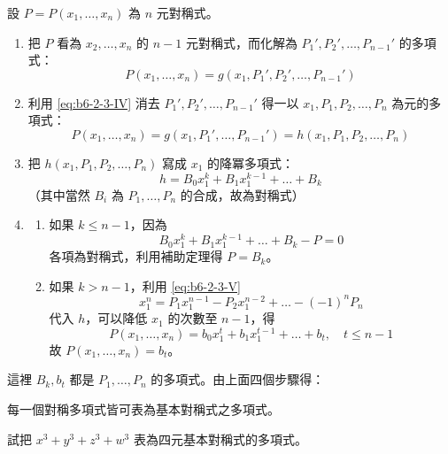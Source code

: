 設 $P=P(x_1, \dots, x_n)$ 為 $n$ 元對稱式。
\begin{enumerate}[label=(\Roman*), leftmargin=2em]
  \item 把 $P$ 看為 $x_2, \dots, x_n$ 的 $n-1$ 元對稱式，而化解為 $P_1', P_2', \dots, P_{n-1}'$ 的多項式：
  \[ P(x_1, \dots, x_n) = g(x_1, P_1', P_2', \dots, P_{n-1}') \]
  \item 利用 \eqref{eq:b6-2-3-IV} 消去 $P_1', P_2', \dots, P_{n-1}'$ 得一以 $x_1, P_1, P_2, \dots, P_n$ 為元的多項式：
  \[ P(x_1, \dots, x_n) = g(x_1, P_1', \dots, P_{n-1}') = h(x_1, P_1, P_2, \dots, P_n) \]
  \item 把 $h(x_1, P_1, P_2, \dots, P_n)$ 寫成 $x_1$ 的降冪多項式：
  \[ h = B_0 x_1^k + B_1 x_1^{k-1} + \dots + B_k \]
  （其中當然 $B_i$ 為 $P_1, \dots, P_n$ 的合成，故為對稱式）
  \item 
  \begin{enumerate}[label=(\alph*)]
    \item 如果 $k \le n-1$，因為
    \[ B_0 x_1^k + B_1 x_1^{k-1} + \dots + B_k - P = 0 \]
    各項為對稱式，利用補助定理得 $P = B_k$。
    \item 如果 $k > n-1$，利用 \eqref{eq:b6-2-3-V}
    \[ x_1^n = P_1 x_1^{n-1} - P_2 x_1^{n-2} + \dots - (-1)^n P_n \]
    代入 $h$，可以降低 $x_1$ 的次數至 $n-1$，得
    \[ P(x_1, \dots, x_n) = b_0 x_1^t + b_1 x_1^{t-1} + \dots + b_t, \quad t \le n-1 \]
    故 $P(x_1, \dots, x_n) = b_t$。
  \end{enumerate}
\end{enumerate}
這裡 $B_k, b_t$ 都是 $P_1, \dots, P_n$ 的多項式。由上面四個步驟得：

\begin{theorem}[對稱式基本定理]\label{thm:b6-2-fundamental-symmetric}
每一個對稱多項式皆可表為基本對稱式之多項式。
\end{theorem}

\begin{example}\label{ex:b6-2-12}
試把 $x^3+y^3+z^3+w^3$ 表為四元基本對稱式的多項式。
\end{example}

